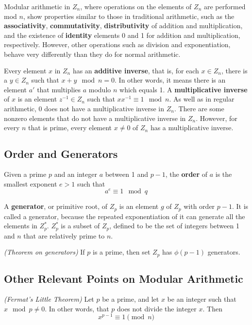 Modular arithmetic in $Z_{n}$, where operations on the elements of $Z_{n}$ are performed mod $n$, show properties similar to those in traditional arithmetic, such as the \textbf{associativity}, \textbf{commutativity}, \textbf{distributivity} of addition and multiplication, and the existence of \textbf{identity} elements 0 and 1 for addition and multiplication, respectively. However, other operations such as division and exponentiation, behave very differently than they do for normal arithmetic. 

Every element $x$ in $Z_{n}$ has an \textbf{additive inverse}, that is, for each $x \in Z_{n}$, there is a $y \in Z_{n}$ such that $x + y \mod n = 0$. In other words, it means there is an element $a'$ that multiplies $a$ modulo $n$ which equals 1.  A \textbf{multiplicative inverse} of $x$ is an element $z^{-1} \in Z_{n}$ such that $xx^{-1} \equiv 1 \mod n$. As well as in regular arithmetic, 0 does not have a multiplicative inverse in $Z_{n}$. There are some nonzero elements that do not have a multiplicative inverse in $Z_{n}$. However, for every $n$ that is prime, every element $x \ne 0$ of $Z_{n}$ has a multiplicative inverse.

\subsection{Order and Generators}

Given a prime $p$ and an integer $a$ between 1 and $p-1$, the \textbf{order} of $a$ is the smallest exponent $e > 1 $ such that
\[
  a^{e} \equiv 1 \mod q
\]

A \textbf{generator}, or primitive root, of $Z_{p}$ is an element $g$ of $Z_{p}$ with order $p-1$. It is called a generator, because the repeated exponentiation of it can generate all the elements in $Z_{p}^{*}$. $Z_{p}^{*}$ is a subset of $Z_{p}$, defined to be the set of integers between 1 and $n$ that are relatively prime to $n$. 

\begin{theorem}
\emph{(Theorem on generators)}
If $p$ is a prime, then set $Z_{p}$ has $\phi(p-1)$ generators.
\end{theorem}

\subsection{Other Relevant Points on Modular Arithmetic}

\begin{theorem}
\emph{(Fermat's Little Theorem)}
Let $p$ be a prime, and let $x$ be an integer such that \\ $x \mod p \ne 0$. In other words, that $p$ does not divide the integer $x$. Then
\[
x^{p-1} \equiv 1 \pmod{n}
\]
\end{theorem}


